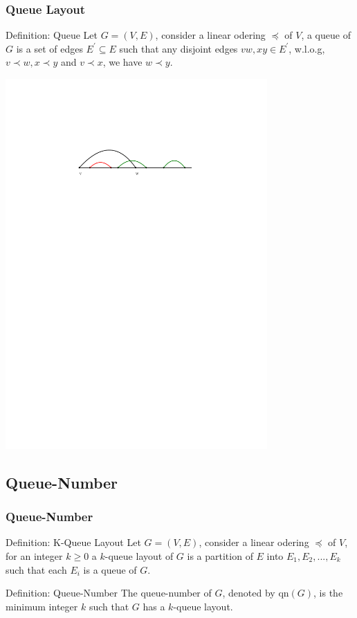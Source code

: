 \documentclass{beamer}
\begin{document}
	\begin{frame}
		\frametitle{Queue Layout}
		\begin{block}{Definition: Queue}
			Let $G = (V,E)$, consider a linear odering $\preceq$ of $V$, a queue of $G$ is a set of edges $E^\prime \subseteq E$ such that any disjoint edges $vw,xy \in E^\prime$, w.l.o.g, $v \prec w, x \prec y$ and $v \prec x$, we have $w \prec y$.
		\end{block}
		\begin{center}
			\vfill
			\includegraphics[width=0.75\textwidth]{pics/vwxy.pdf}
		\end{center}
	\end{frame}
	
	\subsection{Queue-Number}
	\begin{frame}
		\frametitle{Queue-Number}
		\onslide<1->
		{
			\begin{block}{Definition: K-Queue Layout}
				Let $G = (V,E)$, consider a linear odering $\preceq$ of $V$, for an integer $k \ge 0$ a $k$-queue layout of $G$ is a partition of $E$ into $E_1,E_2,...,E_k$ such that each $E_i$ is a queue of $G$.
			\end{block}
		}\pause
		
		\onslide<2->
		{
			\begin{block}{Definition: Queue-Number}
				The queue-number of $G$, denoted by qn$(G)$, is the minimum integer $k$ such that $G$ has a $k$-queue layout.
			\end{block}
		}
	\end{frame}
	
\end{document}
